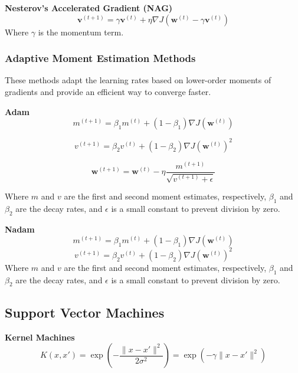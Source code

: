 \documentclass[8pt]{article}
\begin{document}
\begin{multicols}{2}
\textbf{Nesterov's Accelerated Gradient (NAG)}
\begin{equation}
    \mathbf{v}^{(t+1)} = \gamma \mathbf{v}^{(t)} + \eta \nabla J(\mathbf{w}^{(t)} - \gamma \mathbf{v}^{(t)})
\end{equation}
Where $\gamma$ is the momentum term.

\subsubsection*{Adaptive Moment Estimation Methods}
These methods adapt the learning rates based on lower-order moments of gradients and provide an efficient way to converge faster.

\textbf{Adam}
\begin{equation}
    m^{(t+1)} = \beta_1 m^{(t)} + (1 - \beta_1) \nabla J(\mathbf{w}^{(t)})
\end{equation}

\begin{equation}
    v^{(t+1)} = \beta_2 v^{(t)} + (1 - \beta_2) \nabla J(\mathbf{w}^{(t)})^2
\end{equation}

\begin{equation}
    \mathbf{w}^{(t+1)} = \mathbf{w}^{(t)} - \eta \frac{m^{(t+1)}}{\sqrt{v^{(t+1)} + \epsilon}}
\end{equation}

Where $m$ and $v$ are the first and second moment estimates, respectively, $\beta_1$ and $\beta_2$ are the decay rates, and $\epsilon$ is a small constant to prevent division by zero.

\textbf{Nadam}
\begin{equation}
    m^{(t+1)} = \beta_1 m^{(t)} + (1 - \beta_1) \nabla J(\mathbf{w}^{(t)})
\end{equation}
\begin{equation}
    v^{(t+1)} = \beta_2 v^{(t)} + (1 - \beta_2) \nabla J(\mathbf{w}^{(t)})^2
\end{equation}
Where $m$ and $v$ are the first and second moment estimates, respectively, $\beta_1$ and $\beta_2$ are the decay rates, and $\epsilon$ is a small constant to prevent division by zero.


\subsection*{Support Vector Machines}
\textbf{Kernel Machines}
\begin{equation}
    K(x, x') = \exp(-\frac{\|x - x'\|^2}{2\sigma^2}) = \exp(-\gamma \|x - x'\|^2)
\end{equation}


\end{multicols}
\end{document}
